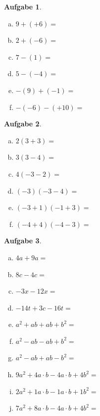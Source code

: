 \documentclass[12pt,fleqn]{article}
\theoremstyle{aufg}
\newtheorem{aufgabe}{Aufgabe}
\theoremstyle{bsp}
\begin{document}
 
    \begin{flushleft}
\begin{aufgabe} ~ \\ 
\begin{multicols}{3} 
\begin{enumerate}[a)] 
\item 
$9+(+6)=$
\item 
$2+(-6)=$
\item 
$7-(1)=$
\item 
$5-(-4)=$
\item 
$-(9)+(-1)=$
\item 
$-(-6)-(+10)=$
\end{enumerate} 
\end{multicols} 
\end{aufgabe} 
\begin{aufgabe} ~ \\ 
\begin{multicols}{3} 
\begin{enumerate}[a)] 
\item 
$2(3+3)=$
\item 
$3(3-4)=$
\item 
$4(-3-2)=$
\item 
$(-3)(-3-4)=$
\item 
$(-3+1)(-1+3)=$
\item 
$(-4+4)(-4-3)=$
\end{enumerate} 
\end{multicols} 
\end{aufgabe} 
\begin{aufgabe} ~ \\ 
\begin{multicols}{2} 
\begin{enumerate}[a)] 
\item 
$4a+9a=$
\item 
$8c-4c=$
\item 
$-3x-12x=$
\item 
$-14t+3c-16t=$
\item 
$a^2+ab+ab+b^2=$
\item 
$a^2-ab-ab+b^2=$
\item 
$a^2-ab+ab-b^2=$
\item 
$9a^2+4a\cdot b-4a\cdot b+4b^2=$
\item 
$2a^2+1a\cdot b-1a\cdot b+1b^2=$
\item 
$7a^2+8a\cdot b-4a\cdot b+4b^2=$
\end{enumerate} 
\end{multicols} 
\end{aufgabe} 

\end{flushleft}
\end{document}
